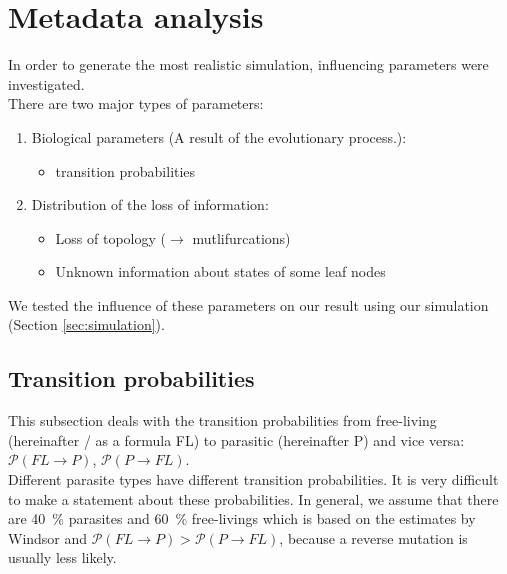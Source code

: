   \section{Metadata analysis}
    In order to generate the most realistic simulation, influencing parameters were investigated. \\
    There are two major types of parameters:
    \begin{enumerate}
      \item Biological parameters (A result of the evolutionary process.):
        \begin{itemize}
          \item transition probabilities
        \end{itemize}
      \item Distribution of the loss of information:
        \begin{itemize}
          \item Loss of topology ($\rightarrow$ mutlifurcations)
          \item Unknown information about states of some leaf nodes
        \end{itemize}
    \end{enumerate}
    We tested the influence of these parameters on our result using our simulation (Section 
      \ref{sec:simulation}).
   
    \subsection{Transition probabilities}
      This subsection deals with the transition probabilities from free-living (hereinafter / as a 
        formula FL) to parasitic (hereinafter P) and vice versa: $\mathcal{P}(FL \rightarrow P)$, 
        $\mathcal{P}(P \rightarrow FL)$. \\
      Different parasite types have different transition probabilities. It is very difficult to make a 
        statement about these probabilities.
      In general, we assume that there are 40~\% parasites and 60~\% free-livings which is based on the 
        estimates by Windsor \cite{Windsor1998} and 
        $\mathcal{P}(FL \rightarrow P) > \mathcal{P}(P \rightarrow FL)$, because a reverse mutation is 
        usually less likely.  \\

